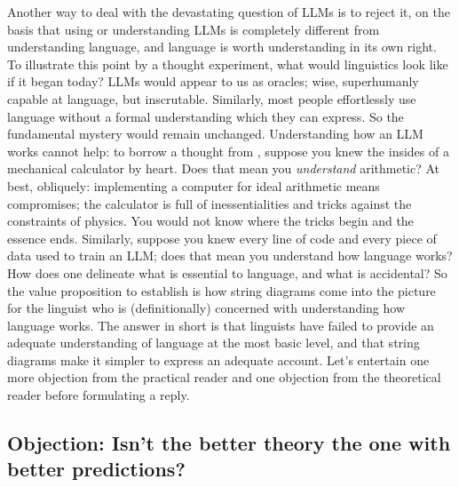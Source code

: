 \begin{fullwidth}
\begin{multicols}{2}
Another way to deal with the devastating question of LLMs is to reject it, on the basis that using or understanding LLMs is completely different from understanding language, and language is worth understanding in its own right. To illustrate this point by a thought experiment, what would linguistics look like if it began today? LLMs would appear to us as oracles; wise, superhumanly capable at language, but inscrutable. Similarly, most people effortlessly use language without a formal understanding which they can express. So the fundamental mystery would remain unchanged. Understanding how an LLM works cannot help: to borrow a thought from \citep{}, suppose you knew the insides of a mechanical calculator by heart. Does that mean you \emph{understand} arithmetic? At best, obliquely: implementing a computer for ideal arithmetic means compromises; the calculator is full of inessentialities and tricks against the constraints of physics. You would not know where the tricks begin and the essence ends. Similarly, suppose you knew every line of code and every piece of data used to train an LLM; does that mean you understand how language works? How does one delineate what is essential to language, and what is accidental? So the value proposition to establish is how string diagrams come into the picture for the linguist who is (definitionally) concerned with understanding how language works. The answer in short is that linguists have failed to provide an adequate understanding of language at the most basic level, and that string diagrams make it simpler to express an adequate account. Let's entertain one more objection from the practical reader and one objection from the theoretical reader before formulating a reply.

\subsection{\textbf{Objection:} Isn't the better theory the one with better predictions?}


\end{multicols}
\end{fullwidth}
